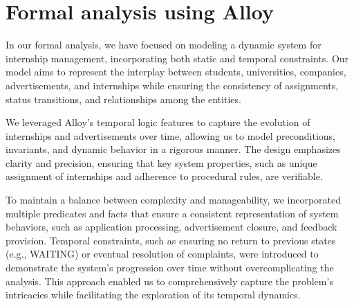 




\chapter{Formal analysis using Alloy}

In our formal analysis, we have focused on modeling a dynamic system for internship management, 
incorporating both static and temporal constraints. Our model aims to represent the interplay between students, 
universities, companies, advertisements, and internships while ensuring the consistency of assignments, 
status transitions, and relationships among the entities. 

We leveraged Alloy’s temporal logic features to capture the evolution of internships and advertisements over time, 
allowing us to model preconditions, invariants, and dynamic behavior in a rigorous manner. 
The design emphasizes clarity and precision, ensuring that key system properties, such as unique assignment 
of internships and adherence to procedural rules, are verifiable.

To maintain a balance between complexity and manageability, we incorporated multiple predicates and facts 
that ensure a consistent representation of system behaviors, such as application processing, advertisement closure, 
and feedback provision. Temporal constraints, such as ensuring no return to previous states (e.g., WAITING) 
or eventual resolution of complaints, were introduced to demonstrate the system's progression over time without 
overcomplicating the analysis. This approach enabled us to comprehensively capture the problem's intricacies while 
facilitating the exploration of its temporal dynamics.


